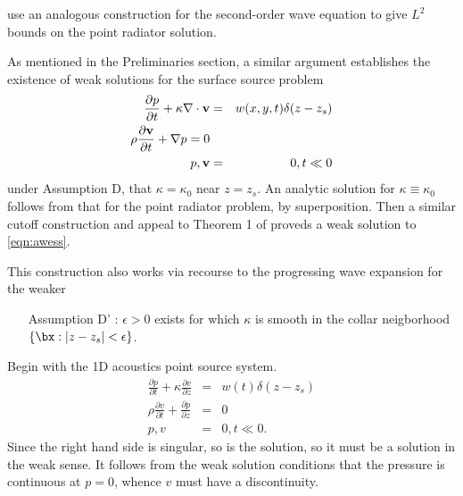 \cite{SantosaSymes:00} use an analogous construction for the
second-order wave equation to give $L^2$ bounds on the point radiator
solution.

As mentioned in the Preliminaries section, a similar argument
establishes the existence of weak solutions for the surface source problem
\begin{eqnarray}
\label{eqn:awess}
\frac{\partial p}{\partial t} + \kappa \nabla \cdot {\bf v} &=&
                                                                w(x,y,t)\delta(z-z_s) \nonumber\\
\rho \frac{\partial {\bf v}}{\partial t} + \nabla p = 0 \nonumber\\
p,{\bf v}&=&0, t \ll 0
\end{eqnarray}
under Assumption D, that $\kappa=\kappa_0$ near $z=z_s$. An analytic
solution for $\kappa \equiv \kappa_0$ follows from that for the point
radiator problem, by superposition. Then a similar cutoff construction
and appeal to Theorem 1 of \cite{BlazekStolkSymes:13} proveds a weak
solution to \ref{eqn:awess}.

This construction also works via recourse to the progressing wave
expansion for the weaker
\begin{itemize}
\item[Assumption D']: $\epsilon > 0$ exists for which $\kappa$ is
smooth in the collar neigborhood $\{\bx: |z-z_s|<\epsilon\}$.
\end{itemize}
  
Begin with the 1D acoustics point source system. 
\begin{eqnarray}
\label{eqn:awe1dptsrc}
\frac{\partial p}{\partial t} +\kappa\frac{\partial 
  v}{\partial z} &=& w(t)\delta(z-z_s) \nonumber\\
\rho \frac{\partial v}{\partial t} + \frac{\partial p}{\partial 
  z}&=&0\nonumber\\
 p,v&=&0, t \ll 0. 
\end{eqnarray}
Since the right hand side is singular, so is the solution, so it must
be a solution in the weak sense. It follows from the weak solution
conditions that the pressure is continuous at $p=0$, whence $v$ must
have a discontinuity. 

